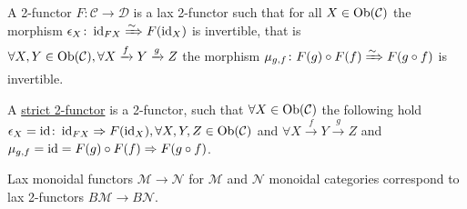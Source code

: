 \begin{defi}
	A 2-functor $ F \colon \mathcal{ C } \to \mathcal{ D }$ is a lax 2-functor such that for all $ X \in \operatorname{Ob} ( \mathcal{ C } )$ 
	the morphism $ \epsilon_X \colon \operatorname{id}_{FX} \xRightarrow{\sim} F ( \operatorname{id}_X )$ is invertible, that is $ \forall X , Y \in \operatorname{Ob} (\mathcal{C}), \forall X \xrightarrow{ f } Y \xrightarrow{ g } Z $ the morphism $ \mu_{ g , f } \colon F ( g ) \circ F ( f )
	\xRightarrow{\sim} F ( g \circ f )$ is invertible.
\end{defi}

\begin{defi}
	A \underline{strict 2-functor} is a 2-functor, such that $ \forall X \in \operatorname{Ob} ( \mathcal { C } )$ the following hold $ \epsilon_X = \operatorname{id} \colon \operatorname{id}_{ FX } \Rightarrow F ( \operatorname{id}_X ), \forall X , Y , Z \in \operatorname{Ob} ( \mathcal{ C } )$ and $ \forall X \xrightarrow{ f } Y \xrightarrow{ g } Z$ and $ \mu_{ g , f } = \operatorname{id} = F ( g ) \circ F ( f ) \Rightarrow F ( g \circ f )$.
\end{defi}

\begin{exmp}
	Lax monoidal functors $ \mathcal{ M } \to \mathcal{ N } $ for $ \mathcal{ M } $ and $ \mathcal{ N } $ monoidal categories correspond to lax 2-functors $ B \mathcal{ M } \to B \mathcal{ N } $.
\end{exmp}

